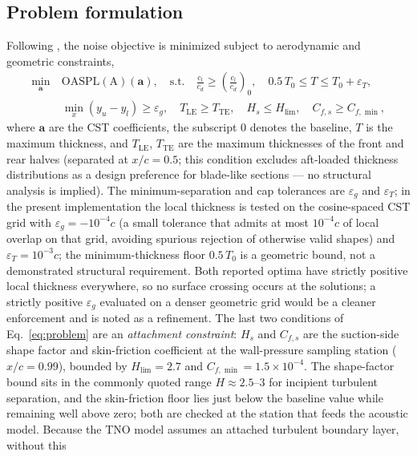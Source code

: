\documentclass[preprint,3p,times]{elsarticle}
\begin{document}
\subsection{Problem formulation}
Following \citet{Kou2023}, the noise objective is minimized subject to
aerodynamic and geometric constraints,
\begin{equation}
\begin{aligned}
\min_{\mathbf{a}}\ & \mathrm{OASPL(A)}(\mathbf{a}),\quad\text{s.t.}\quad
\frac{c_l}{c_d}\ge\left(\frac{c_l}{c_d}\right)_{\!0},\quad
0.5\,T_0\le T\le T_0+\varepsilon_T,\\[2pt]
& \min_x(y_u-y_l)\ge\varepsilon_g,\quad
T_\mathrm{LE}\ge T_\mathrm{TE},\quad
H_s\le H_{\!\lim},\quad
C_{f,s}\ge C_{f,\min},
\end{aligned}
\label{eq:problem}
\end{equation}
where $\mathbf{a}$ are the CST coefficients, the subscript $0$ denotes the
baseline, $T$ is the maximum thickness, and $T_\mathrm{LE}$, $T_\mathrm{TE}$ are
the maximum thicknesses of the front and rear halves (separated at $x/c=0.5$;
this condition excludes aft-loaded thickness distributions as a design
preference for blade-like sections --- no structural analysis is implied).
The
minimum-separation and cap tolerances are $\varepsilon_g$ and $\varepsilon_T$;
in the present implementation the local thickness is tested on the
cosine-spaced CST grid with $\varepsilon_g=-10^{-4}c$ (a small tolerance that
admits at most $10^{-4}c$ of local overlap on that grid, avoiding spurious
rejection of otherwise valid shapes) and $\varepsilon_T=10^{-3}c$; the
minimum-thickness floor $0.5\,T_0$ is a geometric bound, not a demonstrated
structural requirement. Both reported optima have strictly positive local
thickness everywhere, so no surface crossing occurs at the solutions; a
strictly positive $\varepsilon_g$ evaluated on a denser geometric grid would
be a cleaner enforcement and is noted as a refinement. The last two conditions of Eq.~\eqref{eq:problem}
are an \emph{attachment constraint}: $H_s$ and $C_{f,s}$ are the suction-side
shape factor and skin-friction coefficient at the wall-pressure sampling station
($x/c=0.99$), bounded by $H_{\!\lim}=2.7$ and $C_{f,\min}=1.5\times10^{-4}$.
The shape-factor bound sits in the commonly quoted range $H\approx2.5$--$3$
for incipient turbulent separation, and the skin-friction floor lies just
below the baseline value while remaining well above zero; both are checked at
the station that feeds the acoustic model.
Because the TNO model assumes an attached turbulent boundary layer, without this
\end{document}
